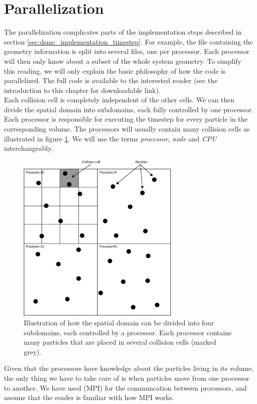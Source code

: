 \section{Parallelization}
\label{sec:dmsc_parallelization}
The parallelization complicates parts of the implementation steps described in section \ref{sec:dsmc_implementation_timestep}. For example, the file containing the geometry information is split into several files, one per processor. Each processor will then only know about a subset of the whole system geometry. To simplify this reading, we will only explain the basic philosophy of how the code is parallelized. The full code is available to the interested reader (see the introduction to this chapter for downloadable link).\\
Each collision cell is completely independent of the other cells. We can then divide the spatial domain into subdomains, each fully controlled by one processor. Each processor is responsible for executing the timestep for every particle in the corresponding volume. The processors will usually contain many collision cells as illustrated in figure \ref{fig:dsmc_parallelization_1}. We will use the terms \textit{processor}, \textit{node} and \textit{CPU} interchangeably.
\begin{figure}[htpb]
\begin{center}
\includegraphics[width=0.7\textwidth, trim=0cm 0cm 0cm 0cm, clip]{DSMC/figures/parallelization.eps}
\end{center}
\caption{Illustration of how the spatial domain can be divided into four subdomains, each controlled by a processor. Each processor contains many particles that are placed in several collision cells (marked grey).}
\label{fig:dsmc_parallelization_1}
\end{figure}
Given that the processors have knowledge about the particles living in its volume, the only thing we have to take care of is when particles move from one processor to another. We have used (MPI) for the communcation between processors, and assume that the reader is familiar with how MPI works. 
